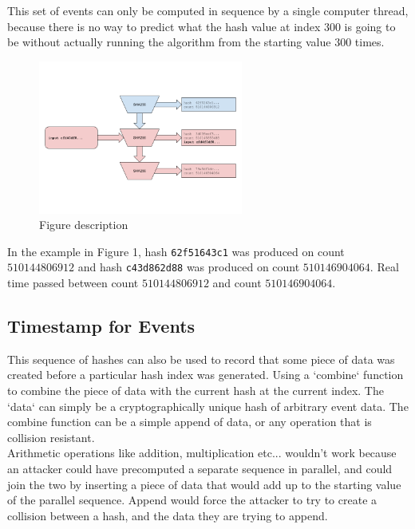 \documentclass[12pt]{article}
\begin{document}
This set of events can only be computed in sequence by a single computer thread, because there is no way to predict what the hash value at index $300$ is going to be without actually running the algorithm from the starting value $300$ times.

\begin{figure}
  \begin{center}
    \centering
    \includegraphics[width=0.6\textwidth]{figures/fig_2.png}
    \caption[Fig 2]{Figure description \label{fig_2}}
  \end{center}
  \end{figure}

In the example in Figure 1, hash \texttt{62f51643c1} was produced on
count $510144806912$ and hash \texttt{c43d862d88} was produced on
count $510146904064$. Real time passed between count $510144806912$
and count $510146904064$.

\subsection{Timestamp for Events}

This sequence of hashes can also be used to record that some piece of data was created before a particular hash index was generated.  Using a `combine` function to combine the piece of data with the current hash at the current index. The `data` can simply be a cryptographically unique hash of arbitrary event data. The combine function can be a simple append of data, or any operation that is collision resistant.\\

Arithmetic operations like addition, multiplication etc... wouldn’t work because an attacker could have precomputed a separate sequence in parallel, and could join the two by inserting a piece of data that would add up to the starting value of the parallel sequence. Append would force the attacker to try to create a collision between a hash, and the data they are trying to append.\\
\end{document}
